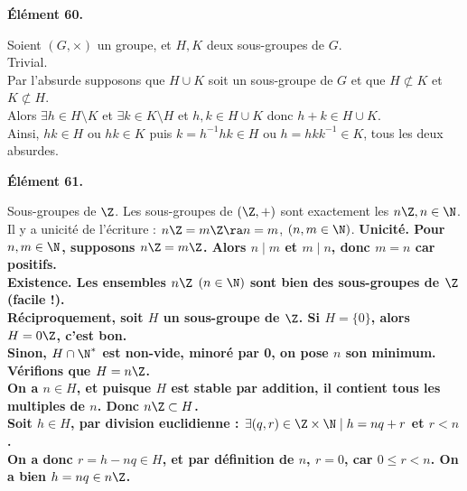 \documentclass[11pt]{article}
\begin{document}
\begin{center}
    \bf{Élément 60.}
\end{center}

\begin{ex}{}{}
    Soient $(G,\times)$ un groupe, et $H,K$ deux sous-groupes de $G$.\\
    \boxed{\la} Trivial.\\
    \boxed{\ra} Par l'absurde supposons que $H\cup K$ soit un sous-groupe de $G$ et que $H\not\subset K$ et $K\not\subset H$.\\
    Alors $\exists h \in H \setminus K$ et $\exists k \in K \setminus H$ et $h,k\in H\cup K$ donc $h+k\in H\cup K$.\\
    Ainsi, $hk\in H$ ou $hk\in K$ puis $k=h^{-1}hk\in H$ ou $h=hkk^{-1}\in K$, tous les deux absurdes.
\end{ex}

\vspace*{-0.4cm}

\begin{center}
    \bf{Élément 61.}
\end{center}

\begin{thm}{Sous-groupes de $\Z$.  }{}
    Les sous-groupes de $(\Z,+)$ sont exactement les $n\Z,n\in\N$.\\
    Il y a unicité de l'écriture : $n\Z=m\Z\ra n=m$, $(n,m\in\N)$.
    \tcblower
    \bf{Unicité.} Pour $n,m\in\N$, supposons $n\Z=m\Z$. Alors $n\mid m$ et $m\mid n$, donc $m=n$ car positifs.\\
    \bf{Existence.} Les ensembles $n\Z$ $(n\in\N)$ sont bien des sous-groupes de $\Z$ (facile !).\\
    Réciproquement, soit $H$ un sous-groupe de $\Z$. Si $H=\{0\}$, alors $H=0\Z$, c'est bon.\\
    Sinon, $H\cap\N^*$ est non-vide, minoré par 0, on pose $n$ son minimum. Vérifions que $H=n\Z$.\\
    \boxed{\supset} On a $n\in H$, et puisque $H$ est stable par addition, il contient tous les multiples de $n$. Donc $n\Z\subset H$.\\
    \boxed{\subset} Soit $h\in H$, par \bf{division euclidienne} : $\exists (q,r)\in\Z\times\N \mid h = nq+r$ et $r<n$.\\
    On a donc $r=h-nq\in H$, et par définition de $n$, $r=0$, car $0\leq r<n$. On a bien $h=nq\in n\Z$.
\end{thm}

\vspace*{-0.4cm}
\end{document}
